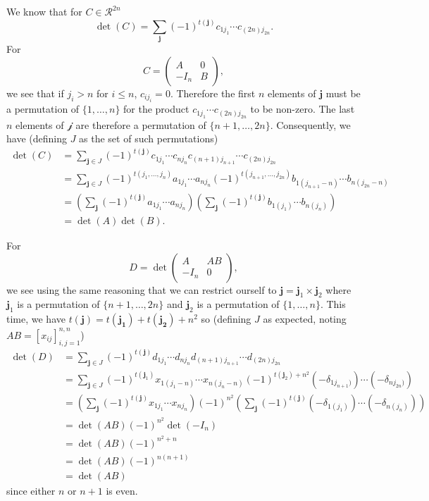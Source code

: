 \begin{solution}
  We know that for $C \in \mathcal{R}^{2n}$
  \[ \det(C) = \sum_{\mathbf{j}} (-1)^{t(\mathbf{j})} c_{1j_1} \cdots c_{(2n)j_{2n}}. \]
  For
  \[
    C = \begin{pmatrix}
      A & 0\\
      -I_n & B
    \end{pmatrix},
  \]
  we see that if $j_i > n$ for $i \leq n$, $c_{ij_i} = 0$.
  Therefore the first $n$ elements of $\mathbf{j}$ must be a permutation of $\{1, \ldots, n\}$
  for the product $c_{1j_1} \cdots c_{(2n)j_{2n}}$ to be non-zero.
  The last $n$ elements of $\mathcal{j}$ are therefore a permutation of $\{n+1, \ldots, 2n\}$.
  Consequently, we have (defining $J$ as the set of such permutations)
  \begin{align*}
    \det(C)
    & = \sum_{\mathbf{j} \in J} (-1)^{t(\mathbf{j})} c_{1j_1} \cdots c_{nj_n} c_{(n+1)j_{n+1}} \cdots c_{(2n)j_{2n}}\\
    & = \sum_{\mathbf{j} \in J} (-1)^{t(j_1, \ldots, j_n)} a_{1j_1} \cdots a_{nj_n} (-1)^{t(j_{n+1}, \ldots, j_{2n})} b_{1(j_{n+1}-n)} \cdots b_{n(j_{2n}-n)}\\
    & = \left(\sum_{\mathbf{j}} (-1)^{t(\mathbf{j})} a_{1j_1} \cdots a_{nj_n}\right)
    \left(\sum_{\mathbf{j}} (-1)^{t(\mathbf{j})} b_{1(j_1)} \cdots b_{n(j_n)}\right)\\
    & = \det(A) \det(B).
  \end{align*}

  For
  \[
    D = \det\begin{pmatrix}
      A & AB\\
      -I_n & 0
    \end{pmatrix},
  \]
  we see using the same reasoning that we can restrict ourself to
  $\mathbf{j} = \mathbf{j}_1 \times \mathbf{j}_2$
  where $\mathbf{j}_1$ is a permutation of $\{n+1, \ldots, 2n\}$
  and $\mathbf{j}_2$ is a permutation of $\{1, \ldots, n\}$.
  This time, we have $t(\mathbf{j}) = t(\mathbf{j_1}) + t(\mathbf{j_2}) + n^2$ so
  (defining $J$ as expected, noting $AB = [x_{ij}]_{i,j=1}^{n,n}$)
  \begin{align*}
    \det(D)
    & = \sum_{\mathbf{j} \in J} (-1)^{t(\mathbf{j})} d_{1j_1} \cdots d_{nj_n} d_{(n+1)j_{n+1}} \cdots d_{(2n)j_{2n}}\\
    & = \sum_{\mathbf{j} \in J} (-1)^{t(\mathbf{j}_1)} x_{1(j_1-n)} \cdots x_{n(j_n-n)} (-1)^{t(\mathbf{j}_2)+n^2} (-\delta_{1j_{n+1})}) \cdots (-\delta_{nj_{2n})})\\
    & = \left(\sum_{\mathbf{j}} (-1)^{t(\mathbf{j})} x_{1j_1} \cdots x_{nj_n}\right)
    (-1)^{n^2}\left(\sum_{\mathbf{j}} (-1)^{t(\mathbf{j})} (-\delta_{1(j_1)}) \cdots (-\delta_{n(j_n)})\right)\\
    & = \det(AB) (-1)^{n^2}\det(-I_n)\\
    & = \det(AB) (-1)^{n^2+n}\\
    & = \det(AB) (-1)^{n(n+1)}\\
    & = \det(AB)
  \end{align*}
  since either $n$ or $n+1$ is even.
\end{solution}

